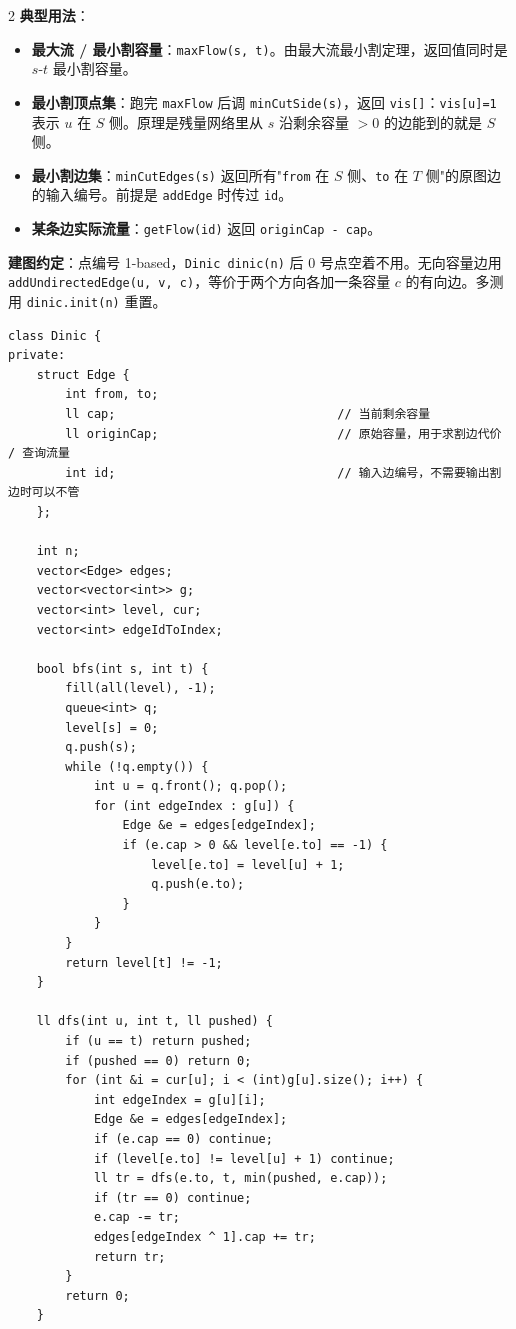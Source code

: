 \begin{multicols*}{2}
		\textbf{典型用法}：

		\begin{itemize}
			\item \textbf{最大流 / 最小割容量}：\texttt{maxFlow(s, t)}。由最大流最小割定理，返回值同时是 $s\text{-}t$ 最小割容量。
			\item \textbf{最小割顶点集}：跑完 \texttt{maxFlow} 后调 \texttt{minCutSide(s)}，返回 \texttt{vis[]}：\texttt{vis[u]=1} 表示 $u$ 在 $S$ 侧。原理是残量网络里从 $s$ 沿剩余容量 $>0$ 的边能到的就是 $S$ 侧。
			\item \textbf{最小割边集}：\texttt{minCutEdges(s)} 返回所有"\texttt{from} 在 $S$ 侧、\texttt{to} 在 $T$ 侧"的原图边的输入编号。前提是 \texttt{addEdge} 时传过 \texttt{id}。
			\item \textbf{某条边实际流量}：\texttt{getFlow(id)} 返回 \texttt{originCap - cap}。
		\end{itemize}

		\textbf{建图约定}：点编号 1-based，\texttt{Dinic dinic(n)} 后 0 号点空着不用。无向容量边用 \texttt{addUndirectedEdge(u, v, c)}，等价于两个方向各加一条容量 $c$ 的有向边。多测用 \texttt{dinic.init(n)} 重置。

		\begin{verbatim}
class Dinic {
private:
    struct Edge {
        int from, to;
        ll cap;                               // 当前剩余容量
        ll originCap;                         // 原始容量，用于求割边代价 / 查询流量
        int id;                               // 输入边编号，不需要输出割边时可以不管
    };

    int n;
    vector<Edge> edges;
    vector<vector<int>> g;
    vector<int> level, cur;
    vector<int> edgeIdToIndex;

    bool bfs(int s, int t) {
        fill(all(level), -1);
        queue<int> q;
        level[s] = 0;
        q.push(s);
        while (!q.empty()) {
            int u = q.front(); q.pop();
            for (int edgeIndex : g[u]) {
                Edge &e = edges[edgeIndex];
                if (e.cap > 0 && level[e.to] == -1) {
                    level[e.to] = level[u] + 1;
                    q.push(e.to);
                }
            }
        }
        return level[t] != -1;
    }

    ll dfs(int u, int t, ll pushed) {
        if (u == t) return pushed;
        if (pushed == 0) return 0;
        for (int &i = cur[u]; i < (int)g[u].size(); i++) {
            int edgeIndex = g[u][i];
            Edge &e = edges[edgeIndex];
            if (e.cap == 0) continue;
            if (level[e.to] != level[u] + 1) continue;
            ll tr = dfs(e.to, t, min(pushed, e.cap));
            if (tr == 0) continue;
            e.cap -= tr;
            edges[edgeIndex ^ 1].cap += tr;
            return tr;
        }
        return 0;
    }


\end{verbatim}
\end{multicols*}
